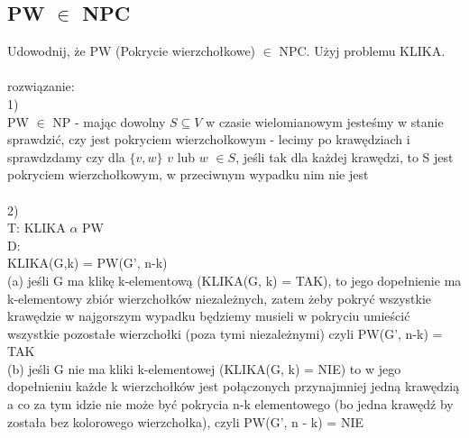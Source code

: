 \documentclass{article}
\begin{document}
\subsection*{PW $\in$ NPC}
Udowodnij, że PW (Pokrycie wierzchołkowe) $\in$ NPC. Użyj problemu KLIKA. \\\\
rozwiązanie:\\
1)\\
PW $\in $ NP - mając dowolny $S \subseteq V$ w czasie wielomianowym 
jesteśmy w stanie sprawdzić, czy jest pokryciem wierzchołkowym - lecimy po krawędziach i sprawdzdamy
czy dla $\{v, w\}$ $v$ lub $w$ $\in S$, jeśli tak dla każdej krawędzi, to S jest pokryciem wierzchołkowym, 
w przeciwnym wypadku nim nie jest \\\\
2)\\
T: KLIKA $\alpha$ PW\\
D: \\
KLIKA(G,k) = PW(G', n-k) \\
(a) jeśli G ma klikę k-elementową (KLIKA(G, k) = TAK), to jego dopełnienie ma 
k-elementowy zbiór wierzchołków niezależnych, zatem żeby pokryć wszystkie krawędzie w najgorszym 
wypadku będziemy musieli w pokryciu umieścić wszystkie pozostałe wierzchołki (poza tymi niezależnymi)
czyli PW(G', n-k) = TAK \\
(b) jeśli G nie ma kliki k-elementowej (KLIKA(G, k) = NIE) to w jego dopełnieniu każde k wierzchołków
jest połączonych przynajmniej jedną krawędzią a co za tym idzie nie może być pokrycia n-k elementowego
(bo jedna krawędź by została bez kolorowego wierzchołka), czyli PW(G', n - k) = NIE
\end{document}
